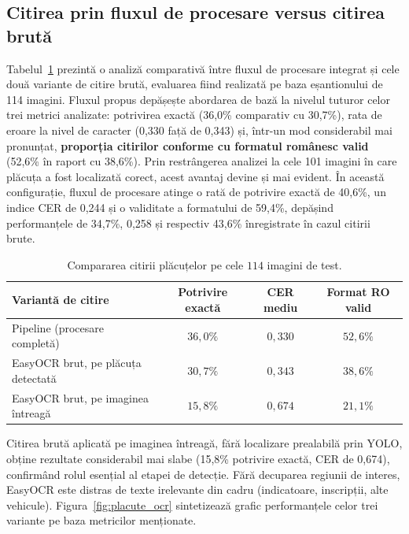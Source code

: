 \documentclass[../../main.tex]{subfiles}
\begin{document}
\subsection{Citirea prin fluxul de procesare versus citirea brută}
\label{subsec:placute_ocr}

Tabelul~\ref{tab:placute_ocr} prezintă o analiză comparativă între fluxul de procesare integrat și cele două variante de citire brută, evaluarea fiind realizată pe baza eșantionului de 114 imagini. Fluxul propus depășește abordarea de bază la nivelul tuturor celor trei metrici analizate: potrivirea exactă (36,0\% comparativ cu 30,7\%), rata de eroare la nivel de caracter (0,330 față de 0,343) și, într-un mod considerabil mai pronunțat, \textbf{proporția citirilor conforme cu formatul românesc valid} (52,6\% în raport cu 38,6\%). Prin restrângerea analizei la cele 101 imagini în care plăcuța a fost localizată corect, acest avantaj devine și mai evident. În această configurație, fluxul de procesare atinge o rată de potrivire exactă de 40,6\%, un indice CER de 0,244 și o validitate a formatului de 59,4\%, depășind performanțele de 34,7\%, 0,258 și respectiv 43,6\% înregistrate în cazul citirii brute.

\begin{table}[h]
    \centering
    \caption{Compararea citirii plăcuțelor pe cele $114$ imagini de test.}
    \label{tab:placute_ocr}
    \begin{tabularx}{\textwidth}{>{\raggedright\arraybackslash}X c c c}
        \hline
        \textbf{Variantă de citire} & \textbf{Potrivire exactă} & \textbf{CER mediu} &
        \textbf{Format RO valid} \\
        \hline
        Pipeline (procesare completă)            & $36{,}0\%$ & $0{,}330$ & $52{,}6\%$ \\
        EasyOCR brut, pe plăcuța detectată       & $30{,}7\%$ & $0{,}343$ & $38{,}6\%$ \\
        EasyOCR brut, pe imaginea întreagă       & $15{,}8\%$ & $0{,}674$ & $21{,}1\%$ \\
        \hline
    \end{tabularx}
\end{table}

Citirea brută aplicată pe imaginea întreagă, fără localizare prealabilă prin YOLO, obține rezultate considerabil mai slabe (15,8\% potrivire exactă, CER de 0,674), confirmând rolul esențial al etapei de detecție. Fără decuparea regiunii de interes, EasyOCR este distras de texte irelevante din cadru (indicatoare, inscripții, alte vehicule). Figura~\ref{fig:placute_ocr} sintetizează grafic performanțele celor trei variante pe baza metricilor menționate.
\end{document}
